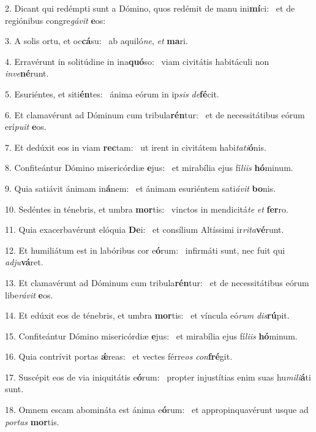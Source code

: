 2. Dicant qui redémpti sunt a Dómino, quos redémit de manu ini\textbf{mí}ci: \ast\  et de regiónibus congre\textit{gá}\textit{vit} \textbf{e}os:\

3. A solis ortu, et oc\textbf{cá}su: \ast\  ab aquiló\textit{ne}, \textit{et} \textbf{ma}ri.\

4. Erravérunt in solitúdine in ina\textbf{quó}so: \ast\  viam civitátis habitáculi non \textit{in}\textit{ve}\textbf{né}runt.\

5. Esuriéntes, et siti\textbf{én}tes: \ast\  ánima eórum in ip\textit{sis} \textit{de}\textbf{fé}cit.\

6. Et clamavérunt ad Dóminum cum tribula\textbf{rén}tur: \ast\  et de necessitátibus eórum erí\textit{pu}\textit{it} \textbf{e}os.\

7. Et dedúxit eos in viam \textbf{rec}tam: \ast\  ut irent in civitátem habi\textit{ta}\textit{ti}\textbf{ó}nis.\

8. Confiteántur Dómino misericórdiæ \textbf{e}jus: \ast\  et mirabília ejus fí\textit{li}\textit{is} \textbf{hó}minum.\

9. Quia satiávit ánimam in\textbf{á}nem: \ast\  et ánimam esuriéntem sati\textit{á}\textit{vit} \textbf{bo}nis.\

10. Sedéntes in ténebris, et umbra \textbf{mor}tis: \ast\  vinctos in mendicitá\textit{te} \textit{et} \textbf{fer}ro.\

11. Quia exacerbavérunt elóquia \textbf{De}i: \ast\  et consílium Altíssimi ir\textit{ri}\textit{ta}\textbf{vé}runt.\

12. Et humiliátum est in labóribus cor e\textbf{ó}rum: \ast\  infirmáti sunt, nec fuit qui \textit{ad}\textit{ju}\textbf{vá}ret.\

13. Et clamavérunt ad Dóminum cum tribula\textbf{rén}tur: \ast\  et de necessitátibus eórum libe\textit{rá}\textit{vit} \textbf{e}os.\

14. Et edúxit eos de ténebris, et umbra \textbf{mor}tis: \ast\  et víncula eó\textit{rum} \textit{dis}\textbf{rú}pit.\

15. Confiteántur Dómino misericórdiæ \textbf{e}jus: \ast\  et mirabília ejus fí\textit{li}\textit{is} \textbf{hó}minum.\

16. Quia contrívit portas \textbf{ǽ}reas: \ast\  et vectes férre\textit{os} \textit{con}\textbf{fré}git.\

17. Suscépit eos de via iniquitátis e\textbf{ó}rum: \ast\  propter injustítias enim suas hu\textit{mi}\textit{li}\textbf{á}ti sunt.\

18. Omnem escam abomináta est ánima e\textbf{ó}rum: \ast\  et appropinquavérunt usque ad \textit{por}\textit{tas} \textbf{mor}tis.\

